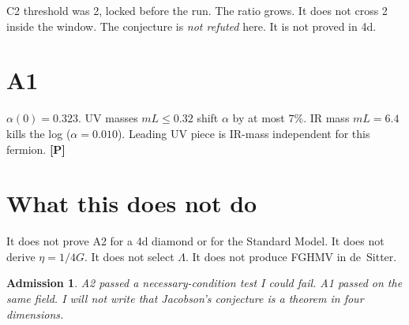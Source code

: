 \documentclass[11pt]{article}
\newtheorem*{admission}{Admission}
\newcommand{\pP}{\textbf{[P]}}
\begin{document}
C2 threshold was 2, locked before the run. The ratio grows. It does
not cross 2 inside the window. The conjecture is \emph{not refuted}
here. It is not proved in 4d.

\section{A1}

$\alpha(0)=0.323$. UV masses $mL\le 0.32$ shift $\alpha$ by at most
$7\%$. IR mass $mL=6.4$ kills the log ($\alpha=0.010$). Leading UV
piece is IR-mass independent for this fermion. \pP{}

\section{What this does not do}

It does not prove A2 for a 4d diamond or for the Standard Model.
It does not derive $\eta=1/4G$. It does not select $\Lambda$. It
does not produce FGHMV in de~Sitter.

\begin{admission}
A2 passed a necessary-condition test I could fail. A1 passed on the
same field. I will not write that Jacobson's conjecture is a theorem
in four dimensions.
\end{admission}
\end{document}
